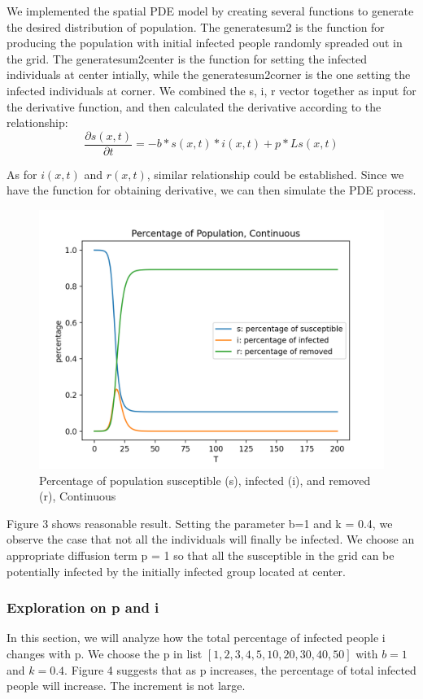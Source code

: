 \documentclass{article}
\begin{document}
We implemented the spatial PDE model by creating several functions to generate the desired distribution of population. The generatesum2 is the function for producing the population with initial infected people randomly spreaded out in the grid. The generatesum2center is the function for setting the infected individuals at center intially, while the generatesum2corner is the one setting the infected individuals at corner. We combined the s, i, r vector together as input for the derivative function, and then calculated the derivative according to the relationship:
$$\frac{\partial s(x,t)}{\partial t} = - b*s(x,t)*i(x,t) + p *L  s(x,t)$$

\noindent
As for $i(x,t)$ and $r(x,t)$, similar relationship could be established. Since we have the function for obtaining derivative, we can then simulate the PDE process.


\begin{figure}[htp]
\centering
\includegraphics[width=.3\textwidth]{odesimulation1.png}
\caption{Percentage of population susceptible (s), infected (i), and removed (r), Continuous }
\label{fig:figure3}
\end{figure}
\FloatBarrier



Figure 3 shows reasonable result. Setting the parameter b=1 and k = 0.4, we observe the case that not all the individuals will finally be infected. We choose an appropriate diffusion term p = 1 so that all the susceptible in the grid can be potentially infected by the initially infected group located at center.



\subsubsection{Exploration on p and i}

In this section, we will analyze how the total percentage of infected people i changes with p. We choose the p in list $[1,2,3,4,5,10,20,30,40,50]$ with $b = 1$ and $k = 0.4$. Figure 4 suggests that as p increases, the percentage of total infected people will increase. The increment is not large.
\end{document}
